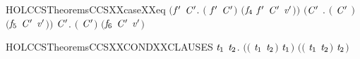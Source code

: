 \begin{SaveVerbatim}{HOLCCSTheoremsCCSXXcaseXXeq}
   \ensuremath{(}\HOLSymConst{\HOLTokenExists{}}\ensuremath{\HOLBoundVar{f}\sp{\prime{}}} \ensuremath{\HOLBoundVar{C}\sp{\prime{}}}. \ensuremath{(} \HOLSymConst{\ensuremath{=}}  \ensuremath{\HOLBoundVar{f}\sp{\prime{}}} \ensuremath{\HOLBoundVar{C}\sp{\prime{}}}\ensuremath{)} \HOLSymConst{\HOLTokenConj{}} \ensuremath{(}\ensuremath{\HOLFreeVar{f}\sb{\mathrm{4}}} \ensuremath{\HOLBoundVar{f}\sp{\prime{}}} \ensuremath{\HOLBoundVar{C}\sp{\prime{}}} \HOLSymConst{\ensuremath{=}} \ensuremath{\HOLFreeVar{v}\sp{\prime{}}}\ensuremath{)}\ensuremath{)} \HOLSymConst{\HOLTokenDisj{}}
   \ensuremath{(}\HOLSymConst{\HOLTokenExists{}}\ensuremath{\HOLBoundVar{C}\sp{\prime{}}} . \ensuremath{(} \HOLSymConst{\ensuremath{=}}  \ensuremath{\HOLBoundVar{C}\sp{\prime{}}} \ensuremath{)} \HOLSymConst{\HOLTokenConj{}} \ensuremath{(}\ensuremath{\HOLFreeVar{f}\sb{\mathrm{5}}} \ensuremath{\HOLBoundVar{C}\sp{\prime{}}}  \HOLSymConst{\ensuremath{=}} \ensuremath{\HOLFreeVar{v}\sp{\prime{}}}\ensuremath{)}\ensuremath{)} \HOLSymConst{\HOLTokenDisj{}}
   \HOLSymConst{\HOLTokenExists{}} \ensuremath{\HOLBoundVar{C}\sp{\prime{}}}. \ensuremath{(} \HOLSymConst{\ensuremath{=}}   \ensuremath{\HOLBoundVar{C}\sp{\prime{}}}\ensuremath{)} \HOLSymConst{\HOLTokenConj{}} \ensuremath{(}\ensuremath{\HOLFreeVar{f}\sb{\mathrm{6}}}  \ensuremath{\HOLBoundVar{C}\sp{\prime{}}} \HOLSymConst{\ensuremath{=}} \ensuremath{\HOLFreeVar{v}\sp{\prime{}}}\ensuremath{)}
\end{SaveVerbatim}
\newcommand{\HOLCCSTheoremsCCSXXcaseXXeq}{\UseVerbatim{HOLCCSTheoremsCCSXXcaseXXeq}}
\begin{SaveVerbatim}{HOLCCSTheoremsCCSXXCONDXXCLAUSES}
\HOLTokenTurnstile{} \HOLSymConst{\HOLTokenForall{}}\ensuremath{\HOLBoundVar{t}\sb{\mathrm{1}}} \ensuremath{\HOLBoundVar{t}\sb{\mathrm{2}}}.
     \ensuremath{(}\ensuremath{(}   \ensuremath{\HOLBoundVar{t}\sb{\mathrm{1}}}  \ensuremath{\HOLBoundVar{t}\sb{\mathrm{2}}}\ensuremath{)} \HOLSymConst{\ensuremath{=}} \ensuremath{\HOLBoundVar{t}\sb{\mathrm{1}}}\ensuremath{)} \HOLSymConst{\HOLTokenConj{}}
     \ensuremath{(}\ensuremath{(}   \ensuremath{\HOLBoundVar{t}\sb{\mathrm{1}}}  \ensuremath{\HOLBoundVar{t}\sb{\mathrm{2}}}\ensuremath{)} \HOLSymConst{\ensuremath{=}} \ensuremath{\HOLBoundVar{t}\sb{\mathrm{2}}}\ensuremath{)}
\end{SaveVerbatim}
